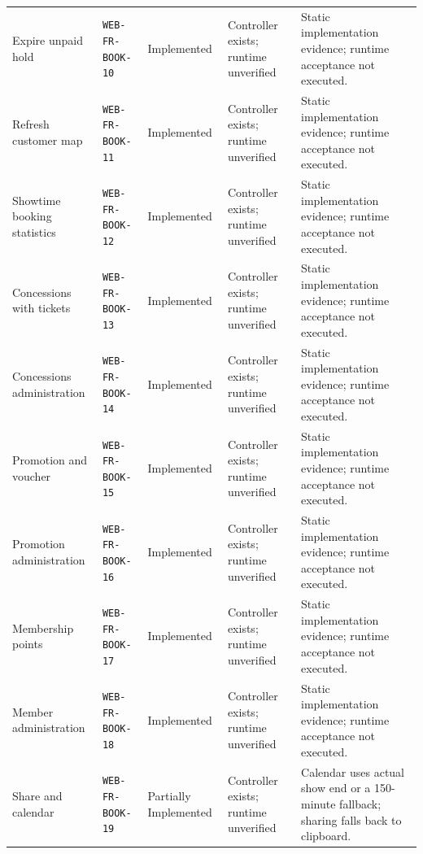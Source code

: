\begin{longtable}{@{}P{0.19000\SRSWidth}P{0.18000\SRSWidth}P{0.15000\SRSWidth}P{0.20000\SRSWidth}P{0.28000\SRSWidth}@{}}
Expire unpaid hold & \texttt{WEB-\allowbreak{}FR-\allowbreak{}BOOK-\allowbreak{}10} & Implemented & Controller exists; runtime unverified & Static implementation evidence; runtime acceptance not executed. \\[3pt]
Refresh customer map & \texttt{WEB-\allowbreak{}FR-\allowbreak{}BOOK-\allowbreak{}11} & Implemented & Controller exists; runtime unverified & Static implementation evidence; runtime acceptance not executed. \\[3pt]
Showtime booking statistics & \texttt{WEB-\allowbreak{}FR-\allowbreak{}BOOK-\allowbreak{}12} & Implemented & Controller exists; runtime unverified & Static implementation evidence; runtime acceptance not executed. \\[3pt]
Concessions with tickets & \texttt{WEB-\allowbreak{}FR-\allowbreak{}BOOK-\allowbreak{}13} & Implemented & Controller exists; runtime unverified & Static implementation evidence; runtime acceptance not executed. \\[3pt]
Concessions administration & \texttt{WEB-\allowbreak{}FR-\allowbreak{}BOOK-\allowbreak{}14} & Implemented & Controller exists; runtime unverified & Static implementation evidence; runtime acceptance not executed. \\[3pt]
Promotion and voucher & \texttt{WEB-\allowbreak{}FR-\allowbreak{}BOOK-\allowbreak{}15} & Implemented & Controller exists; runtime unverified & Static implementation evidence; runtime acceptance not executed. \\[3pt]
Promotion administration & \texttt{WEB-\allowbreak{}FR-\allowbreak{}BOOK-\allowbreak{}16} & Implemented & Controller exists; runtime unverified & Static implementation evidence; runtime acceptance not executed. \\[3pt]
Membership points & \texttt{WEB-\allowbreak{}FR-\allowbreak{}BOOK-\allowbreak{}17} & Implemented & Controller exists; runtime unverified & Static implementation evidence; runtime acceptance not executed. \\[3pt]
Member administration & \texttt{WEB-\allowbreak{}FR-\allowbreak{}BOOK-\allowbreak{}18} & Implemented & Controller exists; runtime unverified & Static implementation evidence; runtime acceptance not executed. \\[3pt]
Share and calendar & \texttt{WEB-\allowbreak{}FR-\allowbreak{}BOOK-\allowbreak{}19} & Partially Implemented & Controller exists; runtime unverified & Calendar uses actual show end or a 150-minute fallback; sharing falls back to clipboard. \\[3pt]

\end{longtable}
